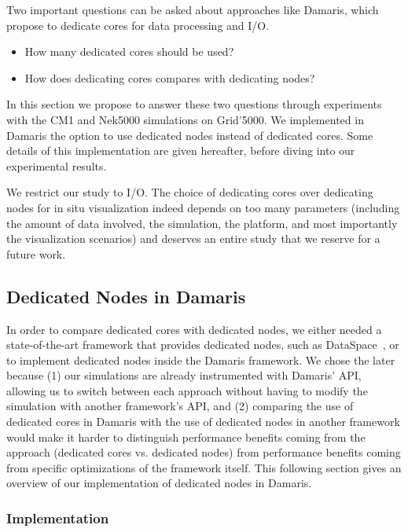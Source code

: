 Two important questions can be asked about approaches like Damaris,
which propose to dedicate cores for data processing and I/O.

\begin{itemize}
\item How many dedicated cores should be used?
\item How does dedicating cores compares with dedicating nodes?
\end{itemize}

In this section we propose to answer these two questions through experiments with
the CM1 and Nek5000 simulations on Grid'5000.
We implemented in Damaris the option to use dedicated nodes instead of dedicated cores.
Some details of this implementation are given hereafter, before diving into our
experimental results.

We restrict our study to I/O. The choice of dedicating cores over dedicating nodes
for in situ visualization indeed depends on too many parameters (including the amount
of data involved, the simulation, the platform, and most importantly the visualization scenarios)
and deserves an entire study that we reserve for a future work.

\subsection{Dedicated Nodes in Damaris}

In order to compare dedicated cores with dedicated nodes, we either needed a state-of-the-art 
framework that provides dedicated nodes, such as DataSpace~\cite{dataspace}, or to 
implement dedicated nodes inside the Damaris framework. We chose the later because 
(1) our simulations are already instrumented with Damaris' API, allowing us to switch between
each approach without having to modify the simulation with another framework's API, and
(2) comparing the use of dedicated cores in Damaris with the use of dedicated nodes in
another framework would make it harder to distinguish performance benefits coming from
the approach (dedicated cores vs. dedicated nodes) from performance benefits
coming from specific optimizations of the framework itself.
This following section gives an overview of our implementation of dedicated nodes in Damaris.

\subsubsection{Implementation}

